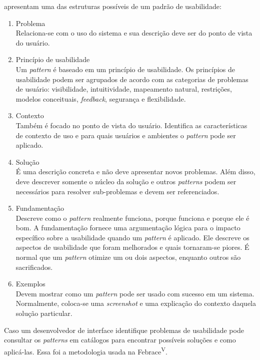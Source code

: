  apresentam uma das estruturas possíveis de um padrão de usabilidade:
    \begin{enumerate}
        \item Problema \\
            Relaciona-se com o uso do sistema e sua descrição deve ser do ponto de vista do usuário.
        \item Princípio de usabilidade \\
            Um \textit{pattern} é baseado em um princípio de usabilidade. Os princípios de usabilidade podem ser agrupados de acordo com as categorias de problemas de usuário: visibilidade, intuitividade, mapeamento natural, restrições, modelos conceituais, \textit{feedback}, segurança e flexibilidade.
        \item Contexto \\
            Também é focado no ponto de vista do usuário. Identifica as características de contexto de uso e para quais usuários e ambientes o \textit{pattern} pode ser aplicado.
        \item Solução \\
            É uma descrição concreta e não deve apresentar novos problemas. Além disso, deve descrever somente o núcleo da solução e outros \textit{patterns} podem ser necessários para resolver sub-problemas e devem ser referenciados.
        \item Fundamentação \\
            Descreve como o \textit{pattern} realmente funciona, porque funciona e porque ele é bom. A fundamentação fornece uma argumentação lógica para o impacto específico sobre a usabilidade quando um \textit{pattern} é aplicado. Ele descreve os aspectos de usabilidade que foram melhorados e quais tornaram-se piores. É normal que um \textit{pattern} otimize um ou dois aspectos, enquanto outros são sacrificados.
        \item Exemplos \\
            Devem mostrar como um \textit{pattern} pode ser usado com sucesso em um sistema. Normalmente, coloca-se uma \textit{screenshot} e uma explicação do contexto daquela solução particular.
    \end{enumerate}

Caso um desenvolvedor de interface identifique problemas de usabilidade pode consultar os \textit{patterns} em catálogos para encontrar possíveis soluções e como aplicá-las. Essa foi a metodologia usada na Febrace\textsuperscript{V}.

